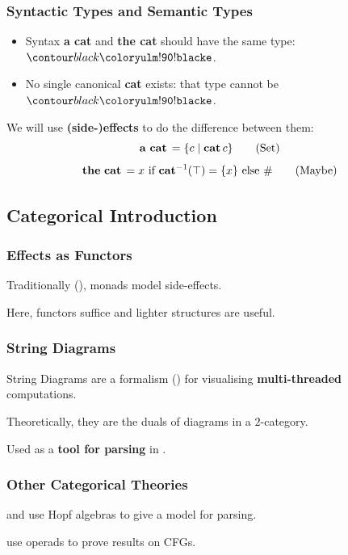 \documentclass[math, english, info]{beamercours}
\begin{document}
\begin{frame}[fragile]
	\frametitle{Syntactic Types and Semantic Types}
	\begin{itemize}
		\item Syntax \textbf{a cat} and \textbf{the cat} should have the same type: $\e$.
		      \pause
		\item No single canonical \textbf{cat} exists: that type cannot be $\e$.
	\end{itemize}
	\pause

	We will use \textbf{(side-)effects} to do the difference between them:
	\begin{equation*}
		\mathbf{a\ cat}\, = \{c \mid \mathbf{cat}\, c\} \tag{Set}
	\end{equation*}
	\begin{equation*}
		\mathbf{the\ cat}\, = x \text{ if } \mathbf{cat}^{-1}(\top) = \{x\} \text{ else } \# \tag{Maybe}
	\end{equation*}
\end{frame}

\subsection{Categorical Introduction}
\begin{frame}
	\frametitle{Effects as Functors}
	Traditionally (\cite{moggiComputationalLambdacalculusMonads1989}), monads model side-effects.
	\pause

	Here, functors suffice and lighter structures are useful.
\end{frame}

\begin{frame}
	\frametitle{String Diagrams}
	String Diagrams are a formalism (\cite{hinzeIntroducingStringDiagrams2023})
	for visualising \textbf{multi-threaded} computations.

	\medskip

	Theoretically, they are the duals of diagrams in a $2$-category.

	\pause
	\medskip
	Used as a \textbf{tool for parsing} in \cite{coeckeMathematicalFoundationsCompositional2010}.
\end{frame}

\begin{frame}
	\frametitle{Other Categorical Theories}
	\cite{marcollimatildeetchomskynoametberwickrobertc.MathematicalStructureSyntactic}
	and \cite{senturiaAlgebraicStructureMorphosyntax2025} use Hopf algebras to
	give a model for parsing.

	\medskip

	\cite{melliesCategoricalContoursChomskySchutzenberger2025} use operads to
	prove results on CFGs.
\end{frame}
\end{document}
